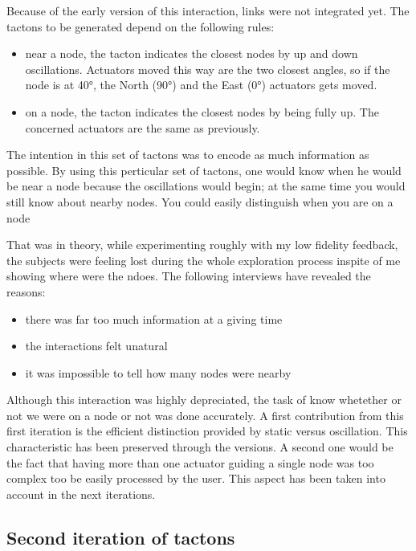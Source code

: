 Because of the early version of this interaction, links were not
integrated yet. The tactons to be generated depend on the following
rules:

\begin{itemize}
\item
  near a node, the tacton indicates the closest nodes by up and down
  oscillations. Actuators moved this way are the two closest angles, so
  if the node is at 40°, the North (90°) and the East (0°) actuators
  gets moved.
\item
  on a node, the tacton indicates the closest nodes by being fully up.
  The concerned actuators are the same as previously.
\end{itemize}

The intention in this set of tactons was to encode as much information
as possible. By using this perticular set of tactons, one would know
when he would be near a node because the oscillations would begin; at
the same time you would still know about nearby nodes. You could easily
distinguish when you are on a node

That was in theory, while experimenting roughly with my low fidelity
feedback, the subjects were feeling lost during the whole exploration
process inspite of me showing where were the ndoes. The following
interviews have revealed the reasons:

\begin{itemize}
\item
  there was far too much information at a giving time
\item
  the interactions felt unatural
\item
  it was impossible to tell how many nodes were nearby
\end{itemize}

Although this interaction was highly depreciated, the task of know
whetether or not we were on a node or not was done accurately. A first
contribution from this first iteration is the efficient distinction
provided by static versus oscillation. This characteristic has been
preserved through the versions. A second one would be the fact that
having more than one actuator guiding a single node was too complex too
be easily processed by the user. This aspect has been taken into account
in the next iterations.

\subsection{Second iteration of
tactons}\label{second-iteration-of-tactons}

